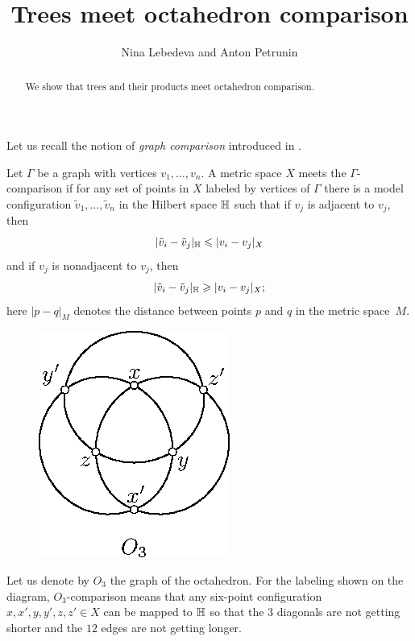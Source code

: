 \documentclass{article}
\begin{document}


\title{Trees meet octahedron comparison}
\author{Nina Lebedeva and Anton Petrunin}

\date{}
\maketitle
\begin{abstract}
We show that trees and their products meet octahedron comparison.
\end{abstract}


Let us recall the notion of \emph{graph comparison} introduced in \cite{lebedeva-petrunin-zolotov}.

Let $\Gamma$ be a graph with vertices $v_1,\dots,v_n$.
A metric space $X$ meets the $\Gamma$-comparison if for any set of points in $X$ labeled by vertices of $\Gamma$ there is a model configuration $\tilde v_1,\dots,\tilde v_n$ in the Hilbert space $\mathbb H$ such that 
if $v_j$ is adjacent to $v_j$, then
\[|\tilde v_i-\tilde v_j|_{\mathbb H}\leqslant | v_i-v_j|_{X}\]
and
if $v_j$ is nonadjacent to $v_j$, then
\[|\tilde v_i-\tilde v_j|_{\mathbb H}\geqslant | v_i-v_j|_{X};\]
here $|p-q|_M$ denotes the distance between points $p$ and $q$ in the metric space~$M$.

\begin{figure}
\vskip-2mm
\centering
\includegraphics{mppics/pic-30}
\end{figure}

Let us denote by $O_3$ the graph of the octahedron.
For the labeling shown on the diagram, $O_3$-comparison means that any six-point configuration $x,x',y,y',z,z'\in X$ can be mapped to $\mathbb H$ so that the 3 diagonals are not getting shorter
and the $12$ edges are not getting longer.
\end{document}
